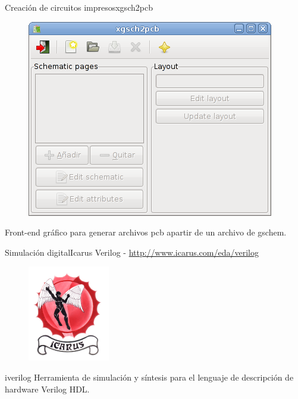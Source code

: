 \documentclass{beamer}
\begin{document}
\begin{frame}{Creación de circuitos impresos}{xgsch2pcb}
  \begin{figure}[!h]
    \centering
    \includegraphics[scale=0.35]{img/xgsch2pcb.png}
  \end{figure}
  Front-end gráfico para generar archivos pcb apartir de un archivo de gschem.
\end{frame}



\begin{frame}{Simulación digital}{Icarus Verilog - \url{http://www.icarus.com/eda/verilog}}
  \begin{figure}[!h]
    \centering
    \includegraphics[scale=0.6]{img/icarus.png}
  \end{figure}
  \alert{iverilog} Herramienta de simulación y síntesis para el lenguaje de descripción de hardware Verilog HDL.
\end{frame}
\end{document}
